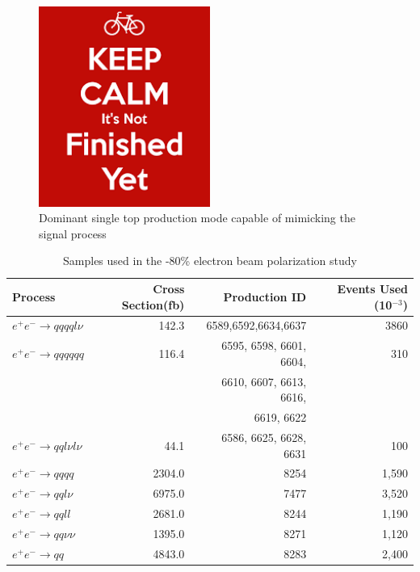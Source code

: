 \begin{figure}
  \centering
  \includegraphics[width=0.5\textwidth]{TopAnalysis/figures/dummy}
  \caption[Dominant single top production mode]{Dominant single top production mode capable of mimicking the signal process}
  \label{fig:singletop}
\end{figure}

\begin{table}
  \centering
  \begin{tabular}{l | r | r |r}
    \toprule
    Process     & Cross Section(fb) & Production ID & Events Used (10$^{-3}$) \\
    \midrule
    $e^+e^-\rightarrow qqqql\nu$ & 142.3 & 6589,6592,6634,6637 & 3860 \\
    \midrule
    $e^+e^-\rightarrow qqqqqq$ & 116.4 & 6595, 6598, 6601, 6604,  & 310 \\
     &  & 6610, 6607, 6613, 6616,  &  \\
     &  &  6619, 6622  &  \\
    \midrule
    $e^+e^-\rightarrow qql\nu l\nu$ & 44.1 & 6586, 6625, 6628, 6631 & 100 \\
    \midrule
    $e^+e^-\rightarrow qqqq$ & 2304.0 & 8254 & 1,590 \\
    \midrule
    $e^+e^-\rightarrow qql\nu$ & 6975.0 & 7477 & 3,520 \\
    \midrule
    $e^+e^-\rightarrow qqll$ & 2681.0 & 8244 & 1,190 \\
    \midrule
    $e^+e^-\rightarrow qq\nu\nu$ & 1395.0 & 8271 & 1,120 \\
    \midrule
    $e^+e^-\rightarrow qq$ & 4843.0 & 8283 & 2,400 \\
    \bottomrule
  \end{tabular}
  \caption{Samples used in the -80\% electron beam polarization study}
  \label{table:topsamplesnegpol}
\end{table}

